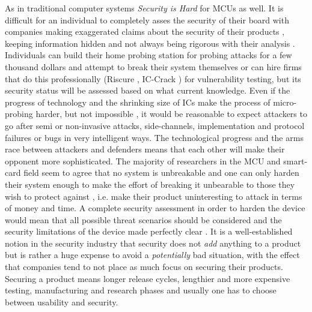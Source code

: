 As in traditional computer systems \emph{Security is Hard} for MCUs as well. It is difficult for an individual to completely asses the security of their board with companies making exaggerated claims about the security of their products \citep{sergei:thesis}, keeping information hidden and not always being rigorous with their analysis \citep{sergei:thesis}. Individuals can build their home probing station for probing attacks for a few thousand dollars \citep{sergei:thesis} \citep{low_cost_probing} and attempt to break their system themselves or can hire firms that do this professionally (Riscure \citep{website:riscure}, {IC-Crack} \citep{atmel_mcu_crack}) for vulnerability testing, but its security status will be assessed based on what current knowledge. Even if the progress of technology and the shrinking size of ICs make the process of micro-probing harder, but not impossible \citep{sergei:thesis} \citep{gutman:memory_remanence}, it would be reasonable to expect attackers to go after semi or non-invasive attacks, side-channels, implementation and protocol failures or bugs in very intelligent ways. The technological progress and the arms race between attackers and defenders means that each other will make their opponent more sophisticated. The majority of researchers in the MCU and smart-card field seem to agree that no system is unbreakable and one can only harden their system enough to make the effort of breaking it unbearable to those they wish to protect against \citep{anderson:cautionary_note} \cite{sergei:thesis}, i.e. make their product uninteresting to attack in terms of money and time. A complete security assessment in order to harden the device would mean that all possible threat scenarios should be considered and the security limitations of the device made perfectly clear \citep{kocher:DPA}. It is a well-established notion in the security industry that security does not \emph{add} anything to a product but is rather a huge expense to avoid a \emph{potentially} bad situation, with the effect that companies tend to not place as much focus on securing their products. Securing a product means longer release cycles, lengthier and more expensive testing, manufacturing and research phases \citep{kocher:DPA} and usually one has to choose between usability and security.